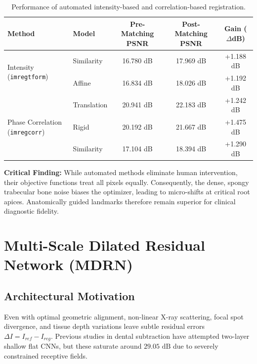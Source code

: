 \documentclass[11pt,a4paper]{article}
\begin{document}
\begin{table}[H]
\centering
\small
\caption{Performance of automated intensity-based and correlation-based registration.}
\label{tab:auto_results}
\begin{tabular}{llccc}
\toprule
\textbf{Method} & \textbf{Model} & \textbf{Pre-Matching PSNR} & \textbf{Post-Matching PSNR} & \textbf{Gain ($\Delta$dB)} \\
\midrule
\multirow{2}{*}{Intensity (\texttt{imregtform})} 
 & Similarity & 16.780 dB & 17.969 dB & +1.188 dB \\
 & Affine     & 16.834 dB & 18.026 dB & +1.192 dB \\
\midrule
\multirow{3}{*}{Phase Correlation (\texttt{imregcorr})} 
 & Translation & 20.941 dB & 22.183 dB & +1.242 dB \\
 & Rigid       & 20.192 dB & 21.667 dB & +1.475 dB \\
 & Similarity  & 17.104 dB & 18.394 dB & +1.290 dB \\
\bottomrule
\end{tabular}
\end{table}

\noindent\textbf{Critical Finding:} While automated methods eliminate human intervention, their objective functions treat all pixels equally. Consequently, the dense, spongy trabecular bone noise biases the optimizer, leading to micro-shifts at critical root apices. Anatomically guided landmarks therefore remain superior for clinical diagnostic fidelity.

\section{Multi-Scale Dilated Residual Network (MDRN)}
\label{sec:mdrn}

\subsection{Architectural Motivation}
Even with optimal geometric alignment, non-linear X-ray scattering, focal spot divergence, and tissue depth variations leave subtle residual errors $\Delta I = I_{ref} - I_{reg}$. Previous studies in dental subtraction have attempted two-layer shallow flat CNNs, but these saturate around $29.05\text{ dB}$ due to severely constrained receptive fields.
\end{document}
